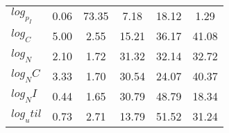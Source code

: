\begin{center}
\begin{longtable}{lccccc}
$log_p_I   $	 & 	        0.06	 & 	       73.35	 & 	        7.18	 & 	       18.12	 & 	        1.29 \\ 
$log_C     $	 & 	        5.00	 & 	        2.55	 & 	       15.21	 & 	       36.17	 & 	       41.08 \\ 
$log_N     $	 & 	        2.10	 & 	        1.72	 & 	       31.32	 & 	       32.14	 & 	       32.72 \\ 
$log_NC    $	 & 	        3.33	 & 	        1.70	 & 	       30.54	 & 	       24.07	 & 	       40.37 \\ 
$log_NI    $	 & 	        0.44	 & 	        1.65	 & 	       30.79	 & 	       48.79	 & 	       18.34 \\ 
$log_util  $	 & 	        0.73	 & 	        2.71	 & 	       13.79	 & 	       51.52	 & 	       31.24 \\ 
\end{longtable}
 \end{center}
